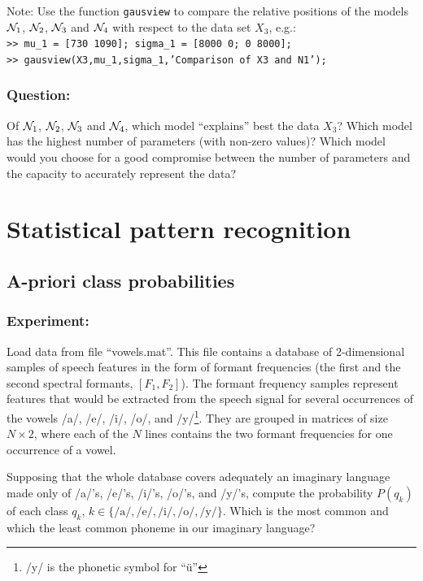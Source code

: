 \documentclass[a4paper]{article}
\newcommand{\mat}[1]{{\tt >> #1} \\}
\newcommand{\com}[1]{{\tt #1}}
\begin{document}
\noindent Note: Use the function \com{gausview} to compare the
relative positions of the models ${\cal N}_1$, ${\cal N}_2$, ${\cal
  N}_3$ and ${\cal N}_4$ with respect to the data set $X_3$, e.g.:
\\
%
\mat{mu\_1 = [730 1090]; sigma\_1 = [8000 0; 0 8000];}
\mat{gausview(X3,mu\_1,sigma\_1,'Comparison of X3 and N1');}
%
\vspace{-\baselineskip}
\subsubsection*{Question:}
Of ${\cal N}_1$, ${\cal N}_2$, ${\cal N}_3$ and ${\cal N}_4$, which
model ``explains'' best the data $X_3$?  Which model has the highest
number of parameters (with non-zero values)?  Which model would you
choose for a good compromise between the number of parameters and the
capacity to accurately represent the data?


\section{Statistical pattern recognition}

\subsection{A-priori class probabilities}
\label{sec:apriori}
\subsubsection{Experiment:}
Load data from file ``vowels.mat''. This file contains a database of
2-dimensional samples of speech features in the form of formant
frequencies (the first and the second spectral formants, $[F_1,F_2]$).
The formant frequency samples represent features that would be
extracted from the speech signal for several occurrences of the vowels
/a/, /e/, /i/, /o/, and /y/\footnote{/y/ is the phonetic symbol for
  ``\"u''}.  They are grouped in matrices of size $N\times2$, where
each of the $N$ lines contains the two formant frequencies for one
occurrence of a vowel.

Supposing that the whole database covers adequately an imaginary
language made only of /a/'s, /e/'s, /i/'s, /o/'s, and /y/'s, compute
the probability $P(q_k)$ of each class $q_k$, $k \in
\{\text{/a/},\text{/e/},\text{/i/},\text{/o/},\text{/y/}\}$. Which is
the most common and which the least common phoneme in our imaginary
language?
\end{document}
